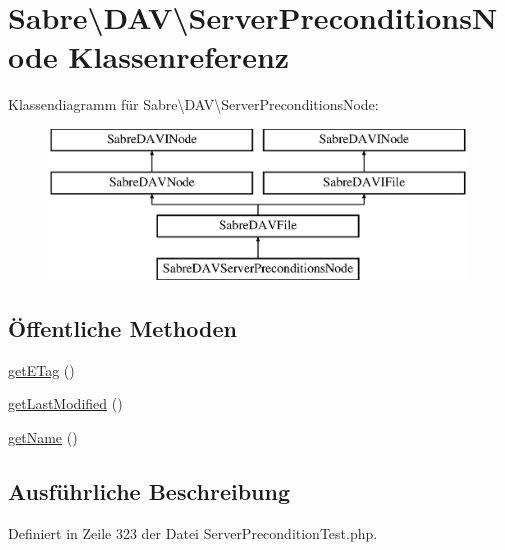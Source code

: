 \hypertarget{class_sabre_1_1_d_a_v_1_1_server_preconditions_node}{}\section{Sabre\textbackslash{}D\+AV\textbackslash{}Server\+Preconditions\+Node Klassenreferenz}
\label{class_sabre_1_1_d_a_v_1_1_server_preconditions_node}
Klassendiagramm für Sabre\textbackslash{}D\+AV\textbackslash{}Server\+Preconditions\+Node\+:\begin{figure}[H]
\begin{center}
\leavevmode
\includegraphics[height=4.000000cm]{class_sabre_1_1_d_a_v_1_1_server_preconditions_node}
\end{center}
\end{figure}
\subsection*{Öffentliche Methoden}
\begin{DoxyCompactItemize}
\item 
\mbox{\hyperlink{class_sabre_1_1_d_a_v_1_1_server_preconditions_node_a87cade6d2776963f690d121cbed1360d}{get\+E\+Tag}} ()
\item 
\mbox{\hyperlink{class_sabre_1_1_d_a_v_1_1_server_preconditions_node_a313a36fb41543920bfe25f44da6ccf8b}{get\+Last\+Modified}} ()
\item 
\mbox{\hyperlink{class_sabre_1_1_d_a_v_1_1_server_preconditions_node_a9ce3a4066f4fd316af509df2aea3ca69}{get\+Name}} ()
\end{DoxyCompactItemize}


\subsection{Ausführliche Beschreibung}


Definiert in Zeile 323 der Datei Server\+Precondition\+Test.\+php.



